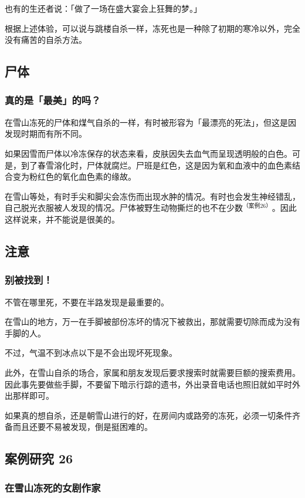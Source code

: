 \documentclass[UTF8]{ctexart}
\begin{document}
也有的生还者说：「做了一场在盛大宴会上狂舞的梦。」

根据上述体验，可以说与跳楼自杀一样，冻死也是一种除了初期的寒冷以外，完全没有痛苦的自杀方法。

\subsection{尸体}

\subsubsection*{真的是「最美」的吗？}

在雪山冻死的尸体和煤气自杀的一样，有时被形容为「最漂亮的死法」，但这是因发现时期而有所不同。

如果因雪而尸体以冷冻保存的状态来看，皮肤因失去血气而呈现透明般的白色。可是，到了春雪溶化时，尸体就腐烂。尸班是红色，这是因为氧和血液中的血色素结合变为粉红色的氧化血色素的缘故。

在雪山等处，有时手尖和脚尖会冻伤而出现水肿的情况。有时也会发生神经错乱，自己脱光衣服被人发现的情况。尸体被野生动物撕烂的也不在少数$^{（案例 26）}$。因此这样说来，并不能说是很美的。

\subsection{注意}

\subsubsection*{别被找到！}

不管在哪里死，不要在半路发现是最重要的。

在雪山的地方，万一在手脚被部份冻坏的情况下被救出，那就需要切除而成为没有手脚的人。

不过，气温不到冰点以下是不会出现坏死现象。

此外，在雪山自杀的场合，家属和朋友发现后要求搜索时就需要巨额的搜索费用。因此事先要做些手脚，不要留下暗示行踪的遗书，外出录音电话也照旧就如平时外出那样即可。

如果真的想自杀，还是朝雪山进行的好，在房间内或路旁的冻死，必须一切条件齐备而且还要不易被发现，倒是挺困难的。

\subsection{案例研究 26}

\subsubsection*{在雪山冻死的女剧作家}
\end{document}
